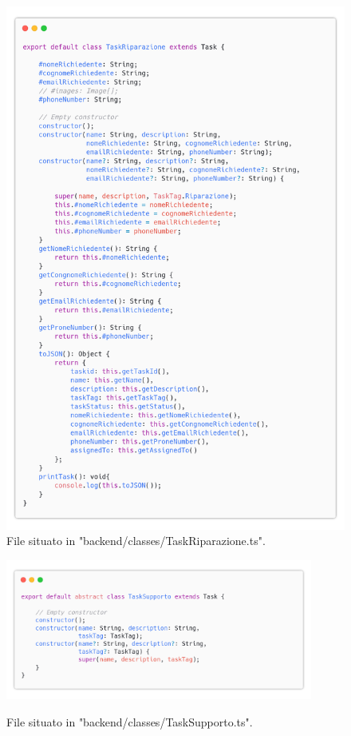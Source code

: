 \documentclass{report}
\begin{document}
\begin{figure}[H]
	\centering\includegraphics[width=1\textwidth]{images/code_task_riparazione.png}
	File situato in "backend/classes/TaskRiparazione.ts".
\end{figure}

\begin{figure}[H]
	\centering\includegraphics[width=0.9\textwidth]{images/code_task_supporto.png}
	
	File situato in "backend/classes/TaskSupporto.ts".
\end{figure}
\end{document}
